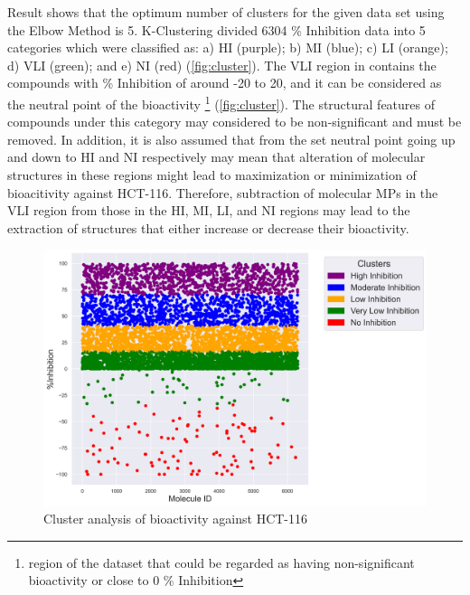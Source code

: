 Result shows that the optimum number of clusters for the given data set using the Elbow Method is 5. K-Clustering divided 6304 \% Inhibition data into 5 categories which were classified as: a) HI (purple); b) MI (blue); c) LI (orange); d) VLI (green); and e) NI (red) (\autoref{fig:cluster}). The VLI region in contains the compounds with \% Inhibition of around -20 to 20, and it can be considered as the neutral point of the bioactivity \footnote{region of the dataset that could be regarded as having non-significant bioactivity or close to 0 \% Inhibition} (\autoref{fig:cluster}). The structural features of compounds under this category may considered to be non-significant and must be removed. In addition, it is also assumed that from the set neutral point going up and down to HI and NI respectively may mean that alteration of molecular structures in these regions might lead to maximization or minimization of bioacitivity against HCT-116. Therefore, subtraction of molecular MPs in the VLI region from those in the HI, MI, LI, and NI regions may lead to the extraction of structures that either increase or decrease their bioactivity.        



\begin{figure}[h] %
	\centering
	\includegraphics[scale=0.6]{cluster.png} %
	\caption{Cluster analysis of bioactivity against HCT-116}
	\label{fig:cluster} %
\end{figure}

